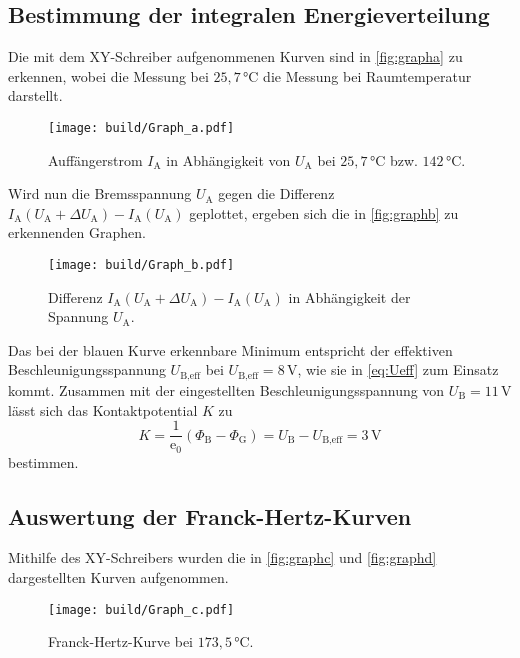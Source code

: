 \subsection{Bestimmung der integralen Energieverteilung}

Die mit dem XY-Schreiber aufgenommenen Kurven sind in \autoref{fig:grapha} zu erkennen, wobei die Messung bei $25,7 \,\unit{\celsius}$ die Messung bei Raumtemperatur darstellt.

\begin{figure}[H]
    \centering
    \texttt{[image: build/Graph\_a.pdf]}
    \caption{Auffängerstrom $I_\text{A}$ in Abhängigkeit von $U_\text{A}$ bei $25,7 \,\unit{\celsius}$ bzw. $142 \,\unit{\celsius}$.}
    \label{fig:grapha}
\end{figure}

Wird nun die Bremsspannung $U_\text{A}$ gegen die Differenz $I_\text{A}(U_\text{A}+ \Delta U_\text{A}) - I_\text{A}(U_\text{A})$ geplottet, ergeben sich die in \autoref{fig:graphb} zu erkennenden Graphen.

\begin{figure}[H]
    \centering
    \texttt{[image: build/Graph\_b.pdf]}
    \caption{Differenz $I_\text{A}(U_\text{A}+ \Delta U_\text{A}) - I_\text{A}(U_\text{A})$ in Abhängigkeit der Spannung $U_\text{A}$.}
    \label{fig:graphb}
\end{figure}

Das bei der blauen Kurve erkennbare Minimum entspricht der effektiven Beschleunigungsspannung $U_{\text{B},\text{eff}}$ bei $U_{\text{B},\text{eff}} = 8 \,\unit{\volt}$, wie sie in \eqref{eq:Ueff} zum Einsatz kommt.
Zusammen mit der eingestellten Beschleunigungsspannung von $U_\text{B} = 11 \,\unit{\volt}$ lässt sich das Kontaktpotential $K$ zu
\begin{equation*}
    K = \frac{1}{\text{e}_0} (\Phi_\text{B} - \Phi_\text{G}) = U_\text{B} - U_{\text{B},\text{eff}} = 3 \,\unit{\volt} %
\end{equation*}
bestimmen.


\subsection{Auswertung der Franck-Hertz-Kurven}

Mithilfe des XY-Schreibers wurden die in \autoref{fig:graphc} und \autoref{fig:graphd} dargestellten Kurven aufgenommen.

\begin{figure}[H]
    \centering
    \texttt{[image: build/Graph\_c.pdf]}
    \caption{Franck-Hertz-Kurve bei $173,5 \,\unit{\celsius}$.}
    \label{fig:graphc}
\end{figure}

